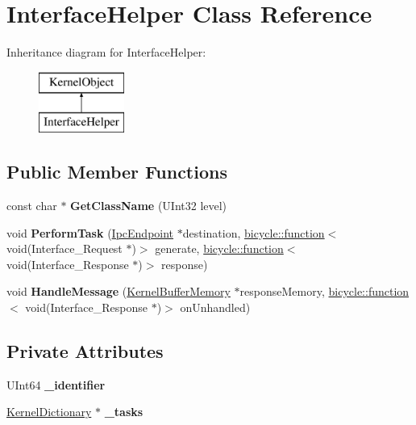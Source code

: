 \hypertarget{class_interface_helper}{}\section{Interface\+Helper Class Reference}
\label{class_interface_helper}
Inheritance diagram for Interface\+Helper\+:\begin{figure}[H]
\begin{center}
\leavevmode
\includegraphics[height=2.000000cm]{class_interface_helper}
\end{center}
\end{figure}
\subsection*{Public Member Functions}
\begin{DoxyCompactItemize}
\item 
\mbox{\label{class_interface_helper_ab0d93a8b33030d4612311d48cd5dded7}} 
const char $\ast$ {\bfseries Get\+Class\+Name} (U\+Int32 level)
\item 
\mbox{\label{class_interface_helper_acd3fda4f54071b0510a27fc7b9814927}} 
void {\bfseries Perform\+Task} (\hyperlink{class_ipc_endpoint}{Ipc\+Endpoint} $\ast$destination, \hyperlink{classbicycle_1_1function}{bicycle\+::function}$<$ void(Interface\+\_\+\+Request $\ast$)$>$ generate, \hyperlink{classbicycle_1_1function}{bicycle\+::function}$<$ void(Interface\+\_\+\+Response $\ast$)$>$ response)
\item 
\mbox{\label{class_interface_helper_aabd0f7625db2f2274b363b14e6f9d74b}} 
void {\bfseries Handle\+Message} (\hyperlink{class_kernel_buffer_memory}{Kernel\+Buffer\+Memory} $\ast$response\+Memory, \hyperlink{classbicycle_1_1function}{bicycle\+::function}$<$ void(Interface\+\_\+\+Response $\ast$)$>$ on\+Unhandled)
\end{DoxyCompactItemize}
\subsection*{Private Attributes}
\begin{DoxyCompactItemize}
\item 
\mbox{\label{class_interface_helper_a5df5576da59e0ee2673a5f48e76f76bf}} 
U\+Int64 {\bfseries \+\_\+identifier}
\item 
\mbox{\label{class_interface_helper_a97ff1d968dade22ac2a5be05e397938f}} 
\hyperlink{class_kernel_dictionary}{Kernel\+Dictionary} $\ast$ {\bfseries \+\_\+tasks}
\end{DoxyCompactItemize}

